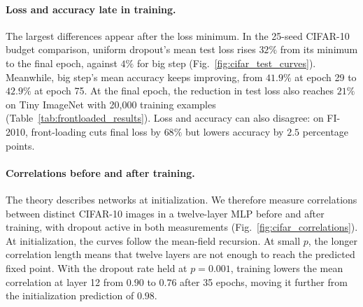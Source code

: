 \paragraph{Loss and accuracy late in training.}
The largest differences appear after the loss minimum. In the 25-seed CIFAR-10 budget comparison, uniform dropout's mean test loss rises $32\%$ from its minimum to the final epoch, against $4\%$ for big step (Fig.~\ref{fig:cifar_test_curves}). Meanwhile, big step's mean accuracy keeps improving, from $41.9\%$ at epoch 29 to $42.9\%$ at epoch 75. At the final epoch, the reduction in test loss also reaches $21\%$ on Tiny ImageNet with 20,000 training examples (Table~\ref{tab:frontloaded_results}). Loss and accuracy can also disagree: on FI-2010, front-loading cuts final loss by $68\%$ but lowers accuracy by $2.5$ percentage points.

\paragraph{Correlations before and after training.}
The theory describes networks at initialization. We therefore measure correlations between distinct CIFAR-10 images in a twelve-layer MLP before and after training, with dropout active in both measurements (Fig.~\ref{fig:cifar_correlations}). At initialization, the curves follow the mean-field recursion. At small $p$, the longer correlation length means that twelve layers are not enough to reach the predicted fixed point. With the dropout rate held at $p=0.001$, training lowers the mean correlation at layer 12 from $0.90$ to $0.76$ after 35 epochs, moving it further from the initialization prediction of $0.98$.
